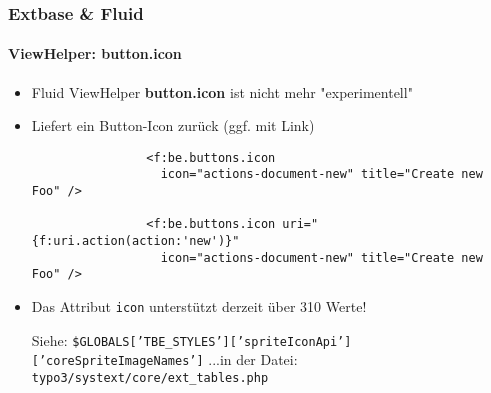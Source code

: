 \begin{frame}[fragile]
	\frametitle{Extbase \& Fluid}
	\framesubtitle{ViewHelper: button.icon}

	\lstset{
		basicstyle=\smaller\ttfamily
	}

	\begin{itemize}
		\item Fluid ViewHelper \textbf{button.icon} ist nicht mehr "experimentell"
		\item Liefert ein Button-Icon zurück (ggf. mit Link)

			\begin{lstlisting}
				<f:be.buttons.icon
				  icon="actions-document-new" title="Create new Foo" />

				<f:be.buttons.icon uri="{f:uri.action(action:'new')}"
				  icon="actions-document-new" title="Create new Foo" />
			\end{lstlisting}

		\item Das Attribut \texttt{icon} unterstützt derzeit über 310 Werte!\newline

			\smaller
				Siehe:\newline
				\texttt{\$GLOBALS['TBE\_STYLES']['spriteIconApi']['coreSpriteImageNames']}\newline
				...in der Datei:\newline
				\texttt{typo3/systext/core/ext\_tables.php}
			\normalsize

	\end{itemize}

\end{frame}


